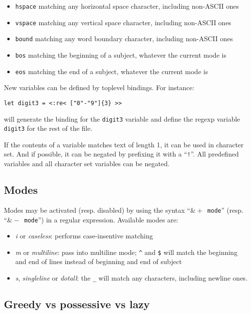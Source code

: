 \documentclass{article}
\begin{document}
\begin{itemize}
\item \texttt{hspace} matching any horizontal space character, including non-ASCII ones
\item \texttt{vspace} matching any vertical space character, including non-ASCII ones
\item \texttt{bound} matching any word boundary character, including non-ASCII ones
\item \texttt{bos} matching the beginning of a subject, whatever the current mode is
\item \texttt{eos} matching the end of a subject, whatever the current mode is
\end{itemize}

New variables can be defined by toplevel bindings. For instance:

\begin{verbatim}
let digit3 = <:re< ["0"-"9"]{3} >>
\end{verbatim}

will generate the binding for the \texttt{digit3} variable and define
the regexp variable \texttt{digit3} for the rest of the file.

If the contents of a variable matches text of length 1, it can be used
in character set. And if possible, it can be negated by prefixing it
with a ``\texttt{!}''. All predefined variables and all character set
variables can be negated.

\subsection{Modes}

Modes may be activated (resp. disabled) by using the syntax
``\texttt{$\&+$ mode}'' (resp. ``\texttt{$\&-$ mode}'') in a regular
expression. Available modes are:

\begin{itemize}
\item \emph{i} or \emph{caseless}: performs case-insentive matching
\item \emph{m} or \emph{multiline}: pass into multiline mode;
  \texttt{\^} and \texttt{\$} will match the beginning and end of
  lines instead of beginning and end of subject
\item \emph{s}, \emph{singleline} or \emph{dotall}: the \texttt{\_}
  will match any characters, including newline ones.
\end{itemize}

\subsection{Greedy vs possessive vs lazy}
\end{document}
